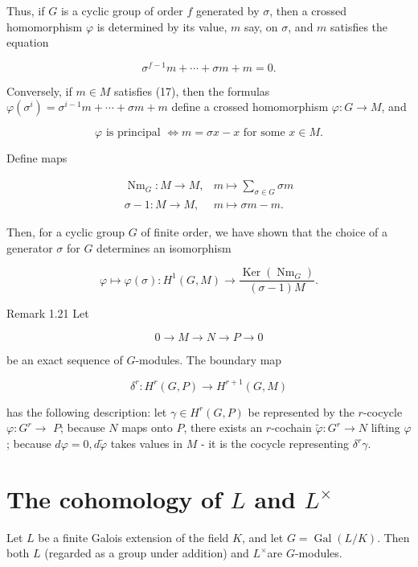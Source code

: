 \documentclass[10pt]{article}
\begin{document}
Thus, if $G$ is a cyclic group of order $f$ generated by $\sigma$, then a crossed homomorphism $\varphi$ is determined by its value, $m$ say, on $\sigma$, and $m$ satisfies the equation


\begin{equation*}
\sigma^{f-1} m+\cdots+\sigma m+m=0 . \tag{17}
\end{equation*}


Conversely, if $m \in M$ satisfies (17), then the formulas $\varphi\left(\sigma^{i}\right)=\sigma^{i-1} m+\cdots+\sigma m+m$ define a crossed homomorphism $\varphi: G \rightarrow M$, and

$$
\varphi \text { is principal } \Longleftrightarrow m=\sigma x-x \text { for some } x \in M .
$$

Define maps

$$
\begin{array}{ll}
\operatorname{Nm}_{G}: M \rightarrow M, & m \mapsto \sum_{\sigma \in G} \sigma m \\
\sigma-1: M \rightarrow M, & m \mapsto \sigma m-m .
\end{array}
$$

Then, for a cyclic group $G$ of finite order, we have shown that the choice of a generator $\sigma$ for $G$ determines an isomorphism

$$
\varphi \mapsto \varphi(\sigma): H^{1}(G, M) \rightarrow \frac{\operatorname{Ker}\left(\operatorname{Nm}_{G}\right)}{(\sigma-1) M} .
$$

Remark 1.21 Let

$$
0 \rightarrow M \rightarrow N \rightarrow P \rightarrow 0
$$

be an exact sequence of $G$-modules. The boundary map

$$
\delta^{r}: H^{r}(G, P) \rightarrow H^{r+1}(G, M)
$$

has the following description: let $\gamma \in H^{r}(G, P)$ be represented by the $r$-cocycle $\varphi: G^{r} \rightarrow$ $P$; because $N$ maps onto $P$, there exists an $r$-cochain $\tilde{\varphi}: G^{r} \rightarrow N$ lifting $\varphi$; because $d \varphi=0, d \tilde{\varphi}$ takes values in $M$ - it is the cocycle representing $\delta^{r} \gamma$.

\section*{The cohomology of $L$ and $L^{\times}$}
Let $L$ be a finite Galois extension of the field $K$, and let $G=\operatorname{Gal}(L / K)$. Then both $L$ (regarded as a group under addition) and $L^{\times}$are $G$-modules.
\end{document}
